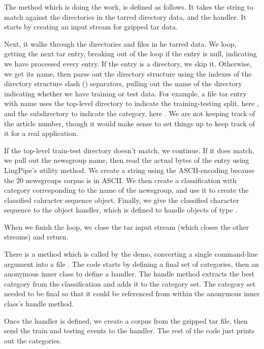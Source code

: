 The  method which is doing the work, is
defined as follows.
%
%
It takes the string to match against the directories in the tarred
directory data, and the handler.  It starts by creating an input
stream for gzipped tar data.  

Next, it walks through the directories and files in he tarred
data.
%
%
We loop, getting the next tar entry, breaking out of the loop if the
entry is null, indicating we have processed every entry.  If the entry
is a directory, we skip it.  Otherwise, we get its name, then parse
out the directory structure using the indexes of the directory
structure slash (\code{/}) separators, pulling out the name of the
directory indicating whether we have training or test data.  For
example, a file tar entry with name
 uses the top-level
directory to indicate the training-testing split, here ,
and the subdirectory to indicate the category, here
.  We are not keeping track of the article number,
though it would make sense to set things up to keep track of it for a
real application.


If the top-level train-test directory doesn't match, we continue.  If
it does match, we pull out the newsgroup name, then read the actual
bytes of the entry using LingPipe's 
utility method.  We create a string using the ASCII-encoding because
the 20 newsgroups corpus is in ASCII.  We then create a classification
with category corresponding to the name of the newsgroup, and use it
to create the classified cahracter sequence object.  Finally, we give
the classified character sequence to the object handler, which is
defined to handle objects of type .

When we finish the loop, we close the tar input stream (which closes
the other streams) and return.

There is a  method which is called by the demo,
converting a single command-line argument into a file
.  The code starts by defining a final set
of categories, then an anonymous inner class to define a handler.
%
%
The handle method extracts the best category from the classification
and adds it to the category set.  The category set needed to be final
so that it could be referenced from within the anonymous inner class's
handle method.

Once the handler is defined, we create a corpus from the gzipped
tar file, then send the train and testing events to the handler.
%
%
The rest of the code just prints out the categories.

